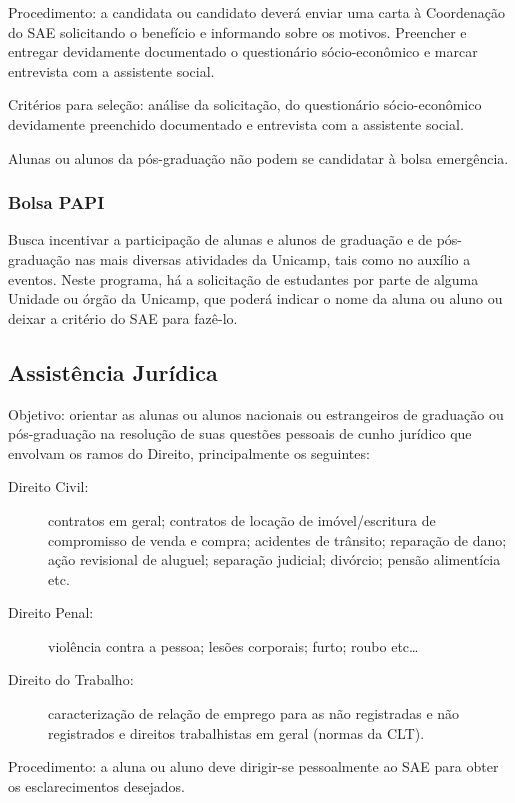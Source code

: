Procedimento: a candidata ou candidato deverá enviar uma carta à Coordenação do
SAE solicitando o benefício e informando sobre os motivos. Preencher e entregar
devidamente documentado o questionário sócio-econômico e marcar entrevista com
a assistente social.

Critérios para seleção: análise da solicitação, do questionário sócio-econômico
devidamente preenchido documentado e entrevista com a assistente social.

Alunas ou alunos da pós-graduação não podem se candidatar à bolsa emergência.

\subsubsection{Bolsa PAPI}

Busca incentivar a participação de alunas e alunos de graduação e de
pós-graduação nas mais diversas atividades da Unicamp, tais como no auxílio a
eventos. Neste programa, há a solicitação de estudantes por parte de alguma
Unidade ou órgão da Unicamp, que poderá indicar o nome da aluna ou aluno ou
deixar a critério do SAE para fazê-lo.

\subsection{Assistência Jurídica}

Objetivo: orientar as alunas ou alunos nacionais ou estrangeiros de graduação
ou pós-graduação na resolução de suas questões pessoais de cunho jurídico que
envolvam os ramos do Direito, principalmente os seguintes:

\begin{description}
\item[Direito Civil:] contratos em geral; contratos de locação de
  imóvel/escritura de compromisso de venda e compra; acidentes de trânsito;
  reparação de dano; ação revisional de aluguel; separação judicial; divórcio;
  pensão alimentícia etc.

\item[Direito Penal:] violência contra a pessoa; lesões corporais; furto; roubo
  etc{\dots}

\item[Direito do Trabalho:] caracterização de relação de emprego para as não
  registradas e não registrados e direitos trabalhistas em geral (normas da
  CLT).
\end{description}

Procedimento: a aluna ou aluno deve dirigir-se pessoalmente ao SAE para obter
os esclarecimentos desejados.

